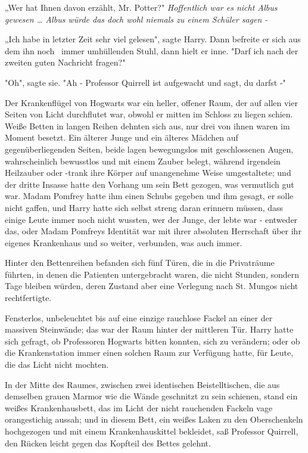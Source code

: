{„Wer hat Ihnen davon erzählt, Mr. Potter?" \emph{Hoffentlich war es nicht Albus gewesen … Albus würde das doch wohl niemals zu einem Schüler sagen} \emph{-}

„Ich habe in letzter Zeit sehr viel gelesen", sagte Harry. Dann befreite er sich aus dem ihn noch ~immer umhüllenden Stuhl, dann hielt er inne. "Darf ich nach der zweiten guten Nachricht fragen?"

"Oh", sagte sie. "Ah - Professor Quirrell ist aufgewacht und sagt, du darfst -"

Der Krankenflügel von Hogwarts war ein heller, offener Raum, der auf allen vier Seiten von Licht durchflutet war, obwohl er mitten im Schloss zu liegen schien. Weiße Betten in langen Reihen dehnten sich aus, nur drei von ihnen waren im Moment besetzt. Ein älterer Junge und ein älteres Mädchen auf gegenüberliegenden Seiten, beide lagen bewegungslos mit geschlossenen Augen, wahrscheinlich bewusstlos und mit einem Zauber belegt, während irgendein Heilzauber oder -trank ihre Körper auf unangenehme Weise umgestaltete; und der dritte Insasse hatte den Vorhang um sein Bett gezogen, was vermutlich gut war. Madam Pomfrey hatte ihm einen Schubs gegeben und ihm gesagt, er solle nicht gaffen, und Harry hatte sich selbst streng daran erinnern müssen, dass einige Leute immer noch nicht wussten, wer der Junge, der lebte war - entweder das, oder Madam Pomfreys Identität war mit ihrer absoluten Herrschaft über ihr eigenes Krankenhaus und so weiter, verbunden, was auch immer.

Hinter den Bettenreihen befanden sich fünf Türen, die in die Privaträume führten, in denen die Patienten untergebracht waren, die nicht Stunden, sondern Tage bleiben würden, deren Zustand aber eine Verlegung nach St. Mungos nicht rechtfertigte.

Fensterlos, unbeleuchtet bis auf eine einzige rauchlose Fackel an einer der massiven Steinwände; das war der Raum hinter der mittleren Tür. Harry hatte sich gefragt, ob Professoren Hogwarts bitten konnten, sich zu verändern; oder ob die Krankenstation immer einen solchen Raum zur Verfügung hatte, für Leute, die das Licht nicht mochten.

In der Mitte des Raumes, zwischen zwei identischen Beistelltischen, die aus demselben grauen Marmor wie die Wände geschnitzt zu sein schienen, stand ein weißes Krankenhausbett, das im Licht der nicht rauchenden Fackeln vage orangestichig aussah; und in diesem Bett, ein weißes Laken zu den Oberschenkeln hochgezogen und mit einem Krankenhauskittel bekleidet, saß Professor Quirrell, den Rücken leicht gegen das Kopfteil des Bettes gelehnt.

}
